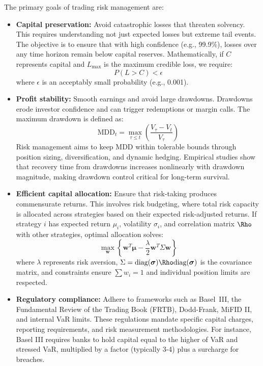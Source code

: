 \documentclass[11pt,a4paper]{article}
\begin{document}
The primary goals of trading risk management are:
\begin{itemize}
    \item \textbf{Capital preservation:} Avoid catastrophic losses that threaten solvency. This requires understanding not just expected losses but extreme tail events. The objective is to ensure that with high confidence (e.g., 99.9\%), losses over any time horizon remain below capital reserves. Mathematically, if $C$ represents capital and $L_{\max}$ is the maximum credible loss, we require:
    \[
    P(L > C) < \epsilon
    \]
    where $\epsilon$ is an acceptably small probability (e.g., 0.001).
    
    \item \textbf{Profit stability:} Smooth earnings and avoid large drawdowns. Drawdowns erode investor confidence and can trigger redemptions or margin calls. The maximum drawdown is defined as:
    \[
    \text{MDD}_t = \max_{\tau \leq t}\left(\frac{V_{\tau} - V_t}{V_{\tau}}\right)
    \]
    Risk management aims to keep MDD within tolerable bounds through position sizing, diversification, and dynamic hedging. Empirical studies show that recovery time from drawdowns increases nonlinearly with drawdown magnitude, making drawdown control critical for long-term survival.
    
    \item \textbf{Efficient capital allocation:} Ensure that risk-taking produces commensurate returns. This involves risk budgeting, where total risk capacity is allocated across strategies based on their expected risk-adjusted returns. If strategy $i$ has expected return $\mu_i$, volatility $\sigma_i$, and correlation matrix $\Rho$ with other strategies, optimal allocation solves:
    \[
    \max_{\mathbf{w}} \left\{\mathbf{w}^T \boldsymbol{\mu} - \frac{\lambda}{2} \mathbf{w}^T \Sigma \mathbf{w}\right\}
    \]
    where $\lambda$ represents risk aversion, $\Sigma = \text{diag}(\boldsymbol{\sigma})\Rho\text{diag}(\boldsymbol{\sigma})$ is the covariance matrix, and constraints ensure $\sum w_i = 1$ and individual position limits are respected.
    
    \item \textbf{Regulatory compliance:} Adhere to frameworks such as Basel~III, the Fundamental Review of the Trading Book (FRTB), Dodd-Frank, MiFID II, and internal VaR limits. These regulations mandate specific capital charges, reporting requirements, and risk measurement methodologies. For instance, Basel III requires banks to hold capital equal to the higher of VaR and stressed VaR, multiplied by a factor (typically 3-4) plus a surcharge for breaches.
\end{itemize}
\end{document}
